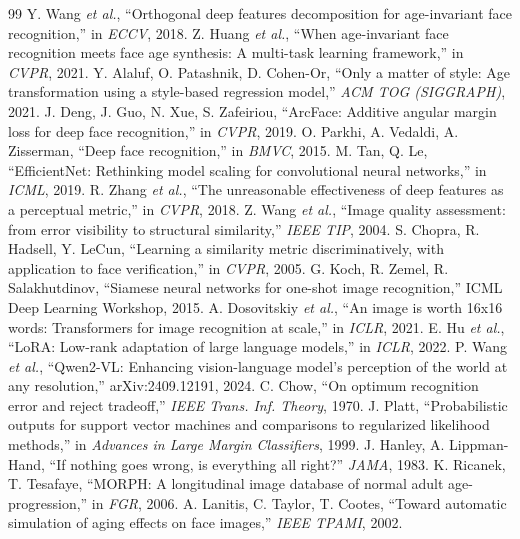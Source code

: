 \documentclass[10pt, a4paper, twocolumn]{article}
\begin{document}
\begin{thebibliography}{99}\small
{} Y. Wang \emph{et al.}, ``Orthogonal deep features decomposition for age-invariant face recognition,'' in \emph{ECCV}, 2018.
 Z. Huang \emph{et al.}, ``When age-invariant face recognition meets face age synthesis: A multi-task learning framework,'' in \emph{CVPR}, 2021.
 Y. Alaluf, O. Patashnik, D. Cohen-Or, ``Only a matter of style: Age transformation using a style-based regression model,'' \emph{ACM TOG (SIGGRAPH)}, 2021.
 J. Deng, J. Guo, N. Xue, S. Zafeiriou, ``ArcFace: Additive angular margin loss for deep face recognition,'' in \emph{CVPR}, 2019.
 O. Parkhi, A. Vedaldi, A. Zisserman, ``Deep face recognition,'' in \emph{BMVC}, 2015.
 M. Tan, Q. Le, ``EfficientNet: Rethinking model scaling for convolutional neural networks,'' in \emph{ICML}, 2019.
 R. Zhang \emph{et al.}, ``The unreasonable effectiveness of deep features as a perceptual metric,'' in \emph{CVPR}, 2018.
 Z. Wang \emph{et al.}, ``Image quality assessment: from error visibility to structural similarity,'' \emph{IEEE TIP}, 2004.
 S. Chopra, R. Hadsell, Y. LeCun, ``Learning a similarity metric discriminatively, with application to face verification,'' in \emph{CVPR}, 2005.
 G. Koch, R. Zemel, R. Salakhutdinov, ``Siamese neural networks for one-shot image recognition,'' ICML Deep Learning Workshop, 2015.
 A. Dosovitskiy \emph{et al.}, ``An image is worth 16x16 words: Transformers for image recognition at scale,'' in \emph{ICLR}, 2021.
 E. Hu \emph{et al.}, ``LoRA: Low-rank adaptation of large language models,'' in \emph{ICLR}, 2022.
 P. Wang \emph{et al.}, ``Qwen2-VL: Enhancing vision-language model's perception of the world at any resolution,'' arXiv:2409.12191, 2024.
 C. Chow, ``On optimum recognition error and reject tradeoff,'' \emph{IEEE Trans. Inf. Theory}, 1970.
 J. Platt, ``Probabilistic outputs for support vector machines and comparisons to regularized likelihood methods,'' in \emph{Advances in Large Margin Classifiers}, 1999.
 J. Hanley, A. Lippman-Hand, ``If nothing goes wrong, is everything all right?'' \emph{JAMA}, 1983.
 K. Ricanek, T. Tesafaye, ``MORPH: A longitudinal image database of normal adult age-progression,'' in \emph{FGR}, 2006.
 A. Lanitis, C. Taylor, T. Cootes, ``Toward automatic simulation of aging effects on face images,'' \emph{IEEE TPAMI}, 2002.
\end{thebibliography}
\end{document}
